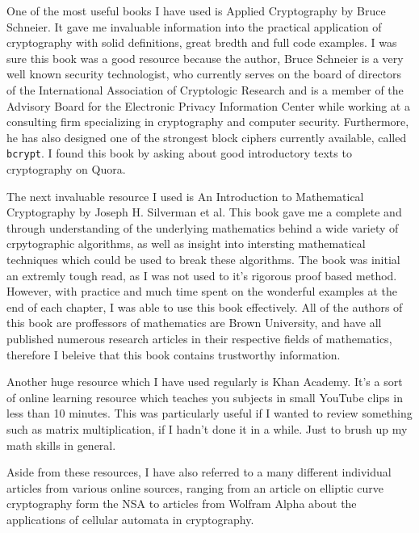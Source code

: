 \documentclass[12pt, a4paper, draft]{report}
\begin{document}
One of the most useful books I have used is Applied Cryptography
by Bruce Schneier\footnotemark. It gave me invaluable information into the
practical application of cryptography with solid definitions,
great bredth and full code examples. I was sure this book was a good
resource because the author, Bruce Schneier is a very well known
security technologist, who currently serves on the board of directors
of the International Association of Cryptologic Research and is a member
of the Advisory Board for the Electronic Privacy Information Center while
working at a consulting firm specializing in cryptography and computer
security. Furthermore, he has also designed one of the strongest block
ciphers currently available, called \texttt{bcrypt}. I found this book
by asking about good introductory texts to cryptography on Quora.

The next invaluable resource I used is An Introduction to Mathematical
Cryptography by Joseph H. Silverman et al\footnotemark. This book gave me
a complete and through understanding of the underlying mathematics behind
a wide variety of crpytographic algorithms, as well as insight into
intersting mathematical techniques which could be used to break these
algorithms. The book was initial an extremly tough read, as I was not used
to it's rigorous proof based method. However, with practice and much time
spent on the wonderful examples at the end of each chapter, I was able to
use this book effectively. All of the authors of this book are proffessors
of mathematics are Brown University, and have all published numerous
research articles in their respective fields of mathematics, therefore I
beleive that this book contains trustworthy information.



Another huge resource which I have used regularly is Khan Academy. It's
a sort of online learning resource which teaches you subjects in small
YouTube clips in less than 10 minutes. This was particularly useful if I
wanted to review something such as matrix multiplication, if I hadn't done
it in a while. Just to brush up my math skills in general.

Aside from these resources, I have also referred to a many different
individual articles from various online sources, ranging from an article on
elliptic curve cryptography form the NSA to articles from Wolfram Alpha
about the applications of cellular automata in cryptography.
\end{document}
